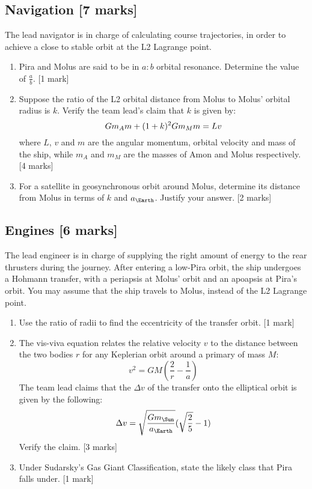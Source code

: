 \documentclass{article}
\begin{document}
\subsection{Navigation [7 marks]}
The lead navigator is in charge of calculating course trajectories, in order to achieve a close to stable orbit at the L2 Lagrange point.
\begin{enumerate}
\item Pira and Molus are said to be in $a:b$ orbital resonance. Determine the value of $\frac{a}{b}$. [1 mark]
\item Suppose the ratio of the L2 orbital distance from Molus to Molus' orbital radius is $k$. Verify the team lead's claim that $k$ is given by:
\begin{equation}
Gm_Am+(1+k)^2Gm_Mm=Lv\\
\end{equation}
where $L$, $v$ and $m$ are the angular momentum, orbital velocity and mass of the ship, while $m_A$ and $m_M$ are the masses of Amon and Molus respectively. [4 marks]
\item For a satellite in geosynchronous orbit around Molus, determine its distance from Molus in terms of $k$ and $a_\Earth$. Justify your answer. [2 marks]
\end{enumerate}

\subsection{Engines [6 marks]}
The lead engineer is in charge of supplying the right amount of energy to the rear thrusters during the journey. After entering a low-Pira orbit, the ship undergoes a Hohmann transfer, with a periapsis at Molus' orbit and an apoapsis at Pira's orbit. You may assume that the ship travels to Molus, instead of the L2 Lagrange point.
\begin{enumerate}
\item Use the ratio of radii to find the eccentricity of the transfer orbit. [1 mark]

\item The vis-viva equation relates the relative velocity $v$ to the distance between the two bodies $r$ for any Keplerian orbit around a primary of mass $M$:
\begin{equation}
v^2=GM(\frac{2}{r}-\frac{1}{a})
\end{equation}
The team lead claims that the $\Delta v$ of the transfer onto the elliptical orbit is given by the following:
\begin{equation}
\Delta v=\sqrt{\frac{Gm_\Sun}{a_\Earth}}(\sqrt{\frac{2}{5}}-1)
\end{equation}
Verify the claim. [3 marks]
\item Under Sudarsky’s Gas Giant Classification, state the likely class that Pira falls under. [1 mark]
\end{enumerate}
\end{document}

